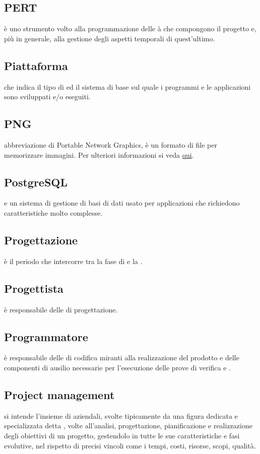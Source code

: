 \documentclass[12pt,a4paper]{article}
\begin{document}
\subsection{PERT} 
 è uno strumento volto alla programmazione delle à che compongono il progetto e, più in generale, alla gestione degli aspetti temporali di quest'ultimo.

\subsection{Piattaforma} 
 che indica il tipo di  ed il sistema  di base sul quale i programmi e le applicazioni sono sviluppati e/o eseguiti.

\subsection{PNG} 
 abbreviazione di Portable Network Graphics, è un formato di file per memorizzare immagini. Per ulteriori informazioni si veda \href{http://it.wikipedia.org/wiki/Portable_Network_Graphics}{qui}.

\subsection{PostgreSQL} 
 e un sistema di gestione di basi di dati  usato per applicazioni che richiedono caratteristiche molto complesse.

\subsection{Progettazione} 
 è il periodo che intercorre tra la fase di \FAD e la \RP.

\subsection{Progettista} 
 è responsabile delle  di progettazione.

\subsection{Programmatore} 
 è responsabile delle  di codifica miranti alla realizzazione del prodotto e delle componenti di ausilio necessarie per l'esecuzione delle prove di verifica e .

\subsection{Project management} 
 si intende l'insieme di  aziendali, svolte tipicamente da una figura dedicata e specializzata detta , volte all'analisi, progettazione, pianificazione e realizzazione degli obiettivi di un progetto, gestendolo in tutte le sue caratteristiche e fasi evolutive, nel rispetto di precisi vincoli come i tempi, costi, risorse, scopi, qualità.
\end{document}
